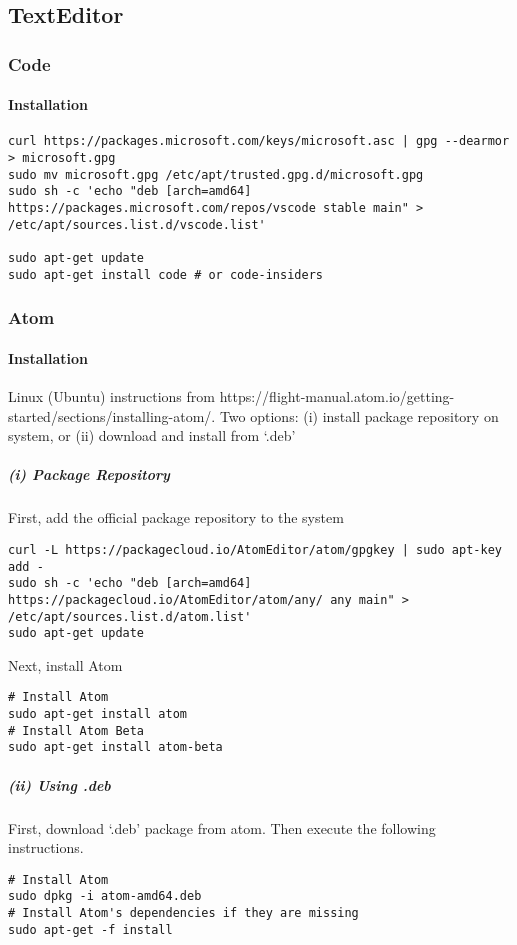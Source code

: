 \subsection{TextEditor}

\subsubsection{Code}

\paragraph{Installation}


\begin{lstlisting}[style=terminalBash]
curl https://packages.microsoft.com/keys/microsoft.asc | gpg --dearmor > microsoft.gpg
sudo mv microsoft.gpg /etc/apt/trusted.gpg.d/microsoft.gpg
sudo sh -c 'echo "deb [arch=amd64] https://packages.microsoft.com/repos/vscode stable main" > /etc/apt/sources.list.d/vscode.list'

sudo apt-get update
sudo apt-get install code # or code-insiders
\end{lstlisting}

\subsubsection{Atom}

\paragraph{Installation}

Linux (Ubuntu) instructions from https://flight-manual.atom.io/getting-started/sections/installing-atom/. Two options: (i) install package repository on system, or (ii) download and install from `.deb'

\subparagraph{(i) Package Repository}

First, add the official package repository to the system
\begin{lstlisting}[style=terminalBash]
curl -L https://packagecloud.io/AtomEditor/atom/gpgkey | sudo apt-key add -
sudo sh -c 'echo "deb [arch=amd64] https://packagecloud.io/AtomEditor/atom/any/ any main" > /etc/apt/sources.list.d/atom.list'
sudo apt-get update
\end{lstlisting}

Next, install Atom
\begin{lstlisting}[style=terminalBash]
# Install Atom
sudo apt-get install atom
# Install Atom Beta
sudo apt-get install atom-beta
\end{lstlisting}

\subparagraph{(ii) Using .deb}

First, download `.deb' package from atom. Then execute the following instructions.
\begin{lstlisting}[style=terminalBash]
# Install Atom
sudo dpkg -i atom-amd64.deb
# Install Atom's dependencies if they are missing
sudo apt-get -f install
\end{lstlisting}